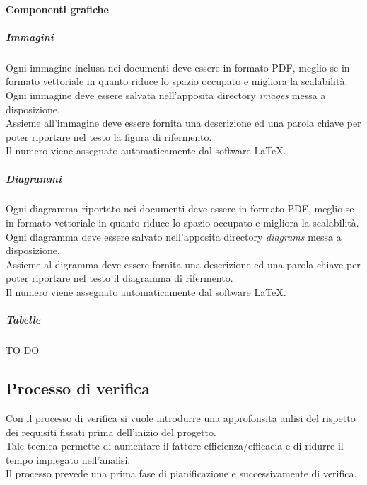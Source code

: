 			\paragraph{Componenti grafiche}
				
				\subparagraph{Immagini}
				Ogni immagine inclusa nei documenti deve essere in formato PDF, meglio se in formato vettoriale in quanto riduce lo spazio occupato e migliora la scalabilità.\\
				Ogni immagine deve essere salvata nell'apposita directory \emph{images} messa a disposizione.\\
				Assieme all'immagine deve essere fornita una descrizione ed una parola chiave per poter riportare nel testo la figura di rifermento.\\
				Il numero viene assegnato automaticamente dal software \LaTeX.

				\subparagraph{Diagrammi}
				Ogni diagramma riportato nei documenti deve essere in formato PDF, meglio se in formato vettoriale in quanto riduce lo spazio occupato e migliora la scalabilità.\\
				Ogni diagramma deve essere salvato nell'apposita directory \emph{diagrams} messa a disposizione.\\
				Assieme al digramma deve essere fornita una descrizione ed una parola chiave per poter riportare nel testo il diagramma di rifermento.\\
				Il numero viene assegnato automaticamente dal software \LaTeX.
				
				\subparagraph{Tabelle} TO DO









	\subsection{Processo di verifica}
	Con il processo di verifica si vuole introdurre una approfonsita anlisi del rispetto dei requisiti fissati prima dell'inizio del progetto.\\
	Tale tecnica permette di aumentare il fattore efficienza/efficacia e di ridurre il tempo impiegato nell'analisi.\\
	Il processo prevede una prima fase di pianificazione e successivamente di verifica.


